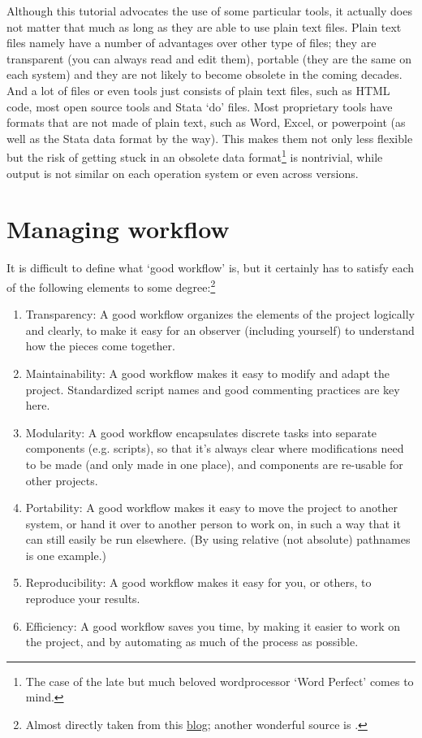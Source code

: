 \documentclass[preprint,authoryear,3p]{elsarticle}
\begin{document}
Although this tutorial advocates the use of some particular tools, it actually does not matter that much as long as they are able to use plain text files. Plain text files namely have a number of advantages over other type of files; they are transparent (you can always read and edit them), portable (they are the same on each system) and they are not likely to become obsolete in the coming decades. And a lot of files or even tools just consists of plain text files, such as HTML code, most open source tools and Stata `do' files. Most proprietary tools have formats that are not made of plain text, such as Word, Excel, or powerpoint (as well as the Stata data format by the way). This makes them not only less flexible but the risk of getting stuck in an obsolete data format\footnote{The case of the late but much beloved wordprocessor `Word Perfect' comes to mind.} is nontrivial, while output is not similar on each operation system or even across versions. 

\section{Managing workflow} It is difficult to define what `good workflow' is, but it certainly has to satisfy each of the following elements to some degree:\footnote{Almost directly taken from this \href{http://blog.revolutionanalytics.com/2010/10/a-workflow-for-r.html}{blog}; another wonderful source is \citet{Healy2013}.} 
\begin{enumerate}
	\item Transparency: A good workflow organizes the elements of the project logically and clearly, to make it easy for an observer (including yourself) to understand how the pieces come together. 
	\item Maintainability: A good workflow makes it easy to modify and adapt the project. Standardized script names and good commenting practices are key here. 
	\item Modularity: A good workflow encapsulates discrete tasks into separate components (e.g. scripts), so that it's always clear where modifications need to be made (and only made in one place), and components are re-usable for other projects. 
	\item Portability: A good workflow makes it easy to move the project to another system, or hand it over to another person to work on, in such a way that it can still easily be run elsewhere. (By using relative (not absolute) pathnames is one example.) 
	\item Reproducibility: A good workflow makes it easy for you, or others, to reproduce your results. 
	\item Efficiency: A good workflow saves you time, by making it easier to work on the project, and by automating as much of the process as possible. 
\end{enumerate}
\end{document}
